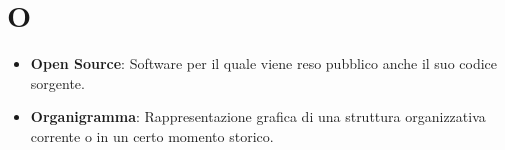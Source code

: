 \section{O}
\begin{itemize}
	\item
	\textbf{Open Source}: Software per il quale viene reso pubblico anche il suo codice sorgente.
	\item
	\textbf{Organigramma}: Rappresentazione grafica di una struttura organizzativa corrente o in un certo momento storico.
\end{itemize}
\newpage
